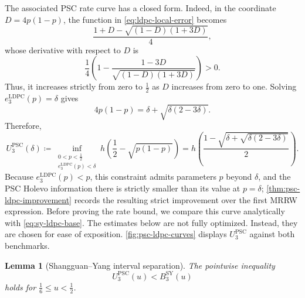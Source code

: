 \documentclass[11pt]{article}
\renewcommand{\leq}{\leqslant}
\newtheorem{lemma}[lemma]{Lemma}
\theoremstyle{remark}
\newcommand{\PSC}{\mathrm{PSC}}
\begin{document}
The associated PSC rate curve has a closed form. Indeed, in the coordinate $D = 4p(1-p)$, the function in \eqref{eq:ldpc-local-error} becomes
\begin{equation*}
\frac{1+D-\sqrt{(1-D)(1+3D)}}{4},
\end{equation*}
whose derivative with respect to $D$ is
\begin{equation*}
\frac{1}{4}\left(1-\frac{1-3D}{\sqrt{(1-D)(1+3D)}}\right)>0.
\end{equation*}
Thus, it increases strictly from zero to $\frac{1}{2}$ as $D$ increases from zero to one. Solving $e_3^{\mathrm{LDPC}}(p) = \delta$ gives
\begin{equation*}
4p(1-p) = \delta+\sqrt{\delta(2-3\delta)}.
\end{equation*}
Therefore,
\begin{equation}
\label{eq:psc-ldpc-rate}
U_3^{\PSC}(\delta)
\coloneqq
\inf_{\substack{0 < p < \frac{1}{2}\\ e_3^{\mathrm{LDPC}}(p) < \delta}}
h\left(\frac{1}{2}-\sqrt{p(1-p)}\right)
=
h\left(\frac{1-\sqrt{\delta+\sqrt{\delta(2-3\delta)}}}{2}\right).
\end{equation}
Because $e_3^{\mathrm{LDPC}}(p) < p$, this constraint admits parameters $p$ beyond $\delta$, and the PSC Holevo information there is strictly smaller than its value at $p = \delta$; \cref{thm:psc-ldpc-improvement} records the resulting strict improvement over the first MRRW expression. Before proving the rate bound, we compare this curve analytically with \eqref{eq:sy-ldpc-base}. The estimates below are not fully optimized. Instead, they are chosen for ease of exposition. \cref{fig:psc-ldpc-curves} displays $U_3^{\PSC}$ against both benchmarks.


\begin{lemma}[Shangguan--Yang interval separation]
\label{lem:psc-sy-interval}
The pointwise inequality
\begin{equation*}
U_3^{\PSC}(u)
< B_3^{\mathrm{SY}}(u)
\end{equation*}
holds for $\frac{1}{6} \leq u < \frac{1}{2}$.
\end{lemma}
\end{document}
